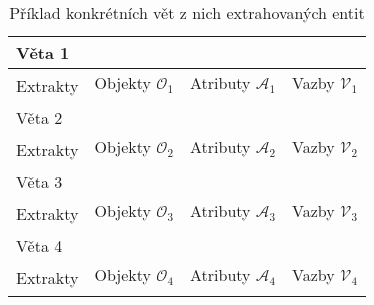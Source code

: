 \begin{table}[H]
	\begin{tabular}{|l|ccc|}
		\hline
		Věta 1                    & \multicolumn{3}{l|}{\senone}                                                                                            \\ \hline
		\multirow{2}{*}{Extrakty} & \multicolumn{1}{c|}{Objekty $\mathcal O_{1}$} & \multicolumn{1}{c|}{Atributy $\mathcal A_{1}$} & Vazby $\mathcal V_{1}$ \\ \cline{2-4}
		                          & \multicolumn{1}{l|}{\objone}                  & \multicolumn{1}{c|}{\attrone}                  & \tripone               \\ \hline
		\hline
		Věta 2                    & \multicolumn{3}{l|}{\sentwo}                                                                                            \\ \hline
		\multirow{2}{*}{Extrakty} & \multicolumn{1}{c|}{Objekty $\mathcal O_{2}$} & \multicolumn{1}{c|}{Atributy $\mathcal A_{2}$} & Vazby $\mathcal V_{2}$ \\ \cline{2-4}
		                          & \multicolumn{1}{l|}{\objtwo}                  & \multicolumn{1}{c|}{\attrtwo}                  & \triptwo               \\ \hline
		\hline
		Věta 3                    & \multicolumn{3}{l|}{\senthree}                                                                                          \\ \hline
		\multirow{2}{*}{Extrakty} & \multicolumn{1}{c|}{Objekty $\mathcal O_{3}$} & \multicolumn{1}{c|}{Atributy $\mathcal A_{3}$} & Vazby $\mathcal V_{3}$ \\ \cline{2-4}
		                          & \multicolumn{1}{l|}{\objthree}                & \multicolumn{1}{c|}{\attrthree}                & \tripthree             \\ \hline
		\hline
		Věta 4                    & \multicolumn{3}{l|}{\senfour}                                                                                           \\ \hline
		\multirow{2}{*}{Extrakty} & \multicolumn{1}{c|}{Objekty $\mathcal O_{4}$} & \multicolumn{1}{c|}{Atributy $\mathcal A_{4}$} & Vazby $\mathcal V_{4}$ \\ \cline{2-4}
		                          & \multicolumn{1}{l|}{\objfour}                 & \multicolumn{1}{c|}{\attrfour}                 & \tripfour              \\ \hline
	\end{tabular}
	\caption{Příklad konkrétních vět z nich extrahovaných entit}\label{tab:exmple_extracts}
\end{table}

